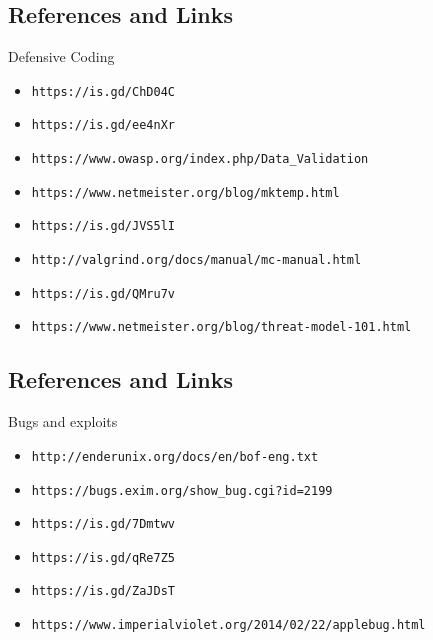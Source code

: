 \documentclass[xga]{xdvislides}
\begin{document}
\subsection{References and Links}
Defensive Coding
\begin{itemize}
	\item \verb+https://is.gd/ChD04C+
	\item \verb+https://is.gd/ee4nXr+
	\item \verb+https://www.owasp.org/index.php/Data_Validation+
	\item \verb+https://www.netmeister.org/blog/mktemp.html+
	\item \verb+https://is.gd/JVS5lI+
	\item \verb+http://valgrind.org/docs/manual/mc-manual.html+
	\item \verb+https://is.gd/QMru7v+
	\item \verb+https://www.netmeister.org/blog/threat-model-101.html+
\end{itemize}

\subsection{References and Links}
Bugs and exploits
\begin{itemize}
	\item \verb+http://enderunix.org/docs/en/bof-eng.txt+
	\item \verb+https://bugs.exim.org/show_bug.cgi?id=2199+
	\item \verb+https://is.gd/7Dmtwv+
	\item \verb+https://is.gd/qRe7Z5+
	\item \verb+https://is.gd/ZaJDsT+
	\item \verb+https://www.imperialviolet.org/2014/02/22/applebug.html+
\end{itemize}
\end{document}
